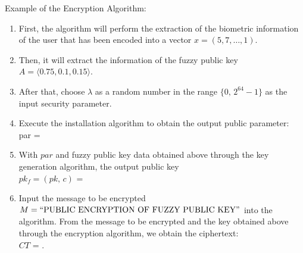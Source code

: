 \documentclass[graybox]{svmult}
\begin{document}
Example of the Encryption Algorithm:
\begin{enumerate}[itemsep=1em]
    \item First, the algorithm will perform the extraction of the biometric information of the user that has been encoded into a vector \( x = (5, 7, \dots, 1) \).
    \item Then, it will extract the information of the fuzzy public key \( A = \langle 0.75, 0.1, 0.15 \rangle \).
    \item After that, choose \( \lambda \) as a random number in the range \( \{0, \, 2^{64} - 1\} \) as the input security parameter.
    \item Execute the installation algorithm to obtain the output public parameter:\\
          par =


    \item With \( par \) and fuzzy public key data obtained above through the key generation algorithm, the output public key \\ \( pk_f = (pk, \, c) \) =

    \item Input the message to be encrypted \\ \( M = \text{\textquotedblleft PUBLIC ENCRYPTION OF FUZZY PUBLIC KEY\textquotedblright} \) into the algorithm. From the message to be encrypted and the key obtained above through the \allowbreak encryption algorithm, we obtain the ciphertext:\\ \( CT \)
          =  .
\end{enumerate}
\end{document}
